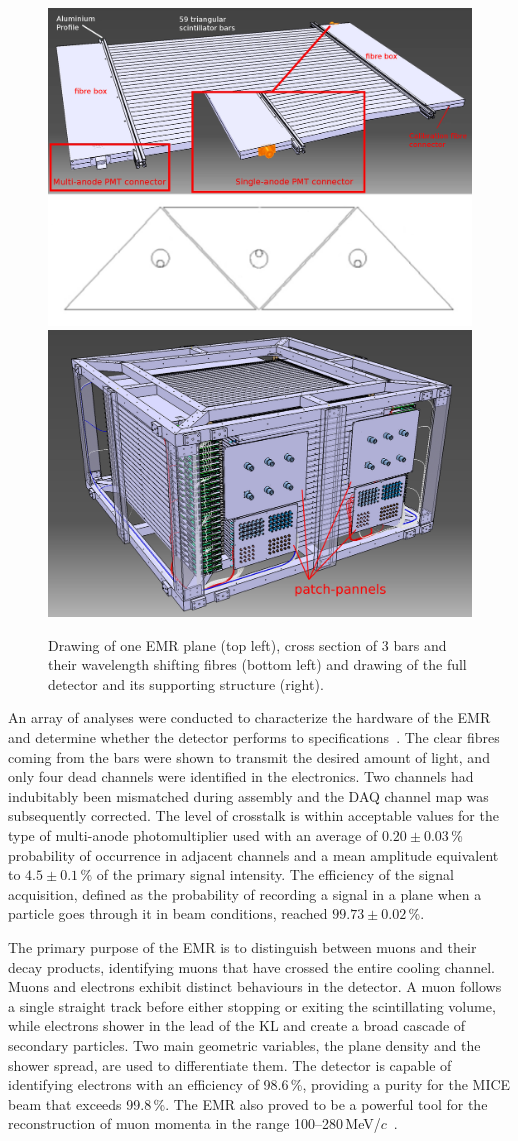 \begin{figure}[htb!]
	\begin{center}
		\includegraphics[width=0.465\columnwidth]{EMR1.png}
		\hfill
		\includegraphics[width=0.515\columnwidth]{EMR2.jpg}
		\caption{Drawing of one EMR plane (top left), cross section of 3 bars and their wavelength shifting fibres (bottom left) and drawing of the full detector and its supporting structure (right).}
		\label{fig:EMR}
	\end{center}
\end{figure}

An array of analyses were conducted to characterize the hardware of the EMR and determine whether the detector performs to specifications~\cite{Drielsma:2017doj}. The clear fibres coming from the bars were shown to transmit the desired amount of light, and only four dead channels were identified in the electronics. Two channels had indubitably been mismatched during assembly and the DAQ channel map was subsequently corrected. The level of crosstalk is within acceptable values for the type of multi-anode photomultiplier used with an average of $0.20\pm0.03$\,\% probability of occurrence in adjacent channels and a mean amplitude equivalent to $4.5\pm0.1$\,\% of the primary signal intensity. The efficiency of the signal acquisition, defined as the probability of recording a signal in a plane when a particle goes through it in beam conditions, reached $99.73\pm0.02$\,\%.

The primary purpose of the EMR is to distinguish between muons and their decay products, identifying
muons that have crossed the entire cooling channel. Muons and electrons exhibit distinct behaviours in the detector. A muon follows a single straight track before either stopping or exiting the scintillating volume, while electrons shower in the lead of the KL and create a broad cascade of secondary particles. Two main geometric variables, the plane density and the shower spread, are used to differentiate them. The detector is capable of identifying electrons with an efficiency of 98.6\,\%, providing a purity for the MICE beam that exceeds 99.8\,\%. The EMR also proved to be a powerful tool for the reconstruction of muon momenta in the range 100--280\,MeV/$c$~\cite{2015JInst..10P2012A}.

